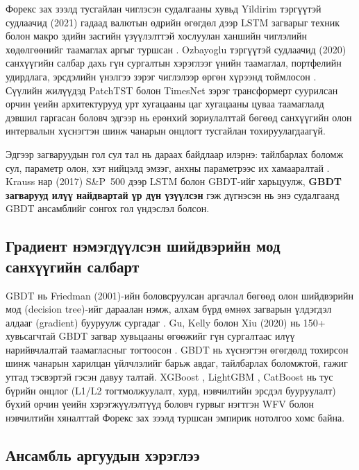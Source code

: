 Форекс зах зээлд тусгайлан чиглэсэн судалгааны хувьд Yildirim тэргүүтэй судлаачид (2021) гадаад валютын өдрийн өгөгдөл дээр LSTM загварыг техник болон макро эдийн засгийн үзүүлэлттэй хослуулан ханшийн чиглэлийн хөдөлгөөнийг таамаглах аргыг туршсан \cite{yildirim2021forecasting}. Ozbayoglu тэргүүтэй судлаачид (2020) санхүүгийн салбар дахь гүн сургалтын хэрэглээг үнийн таамаглал, портфелийн удирдлага, эрсдэлийн үнэлгээ зэрэг чиглэлээр өргөн хүрээнд тоймлосон \cite{ozbayoglu2020deep}. Сүүлийн жилүүдэд PatchTST \cite{nie2023patchtst} болон TimesNet \cite{wu2023timesnet} зэрэг трансформерт суурилсан орчин үеийн архитектурууд урт хугацааны цаг хугацааны цуваа таамаглалд дэвшил гаргасан боловч эдгээр нь ерөнхий зориулалттай бөгөөд санхүүгийн олон интервалын хүснэгтэн шинж чанарын онцлогт тусгайлан тохируулагдаагүй.

Эдгээр загваруудын гол сул тал нь дараах байдлаар илэрнэ: тайлбарлах боломж сул, параметр олон, хэт нийцэлд эмзэг, анхны параметрээс их хамааралтай \cite{krauss2017deep}. Krauss нар (2017) S\&P~500 дээр LSTM болон GBDT-ийг харьцуулж, \textbf{GBDT загварууд илүү найдвартай үр дүн үзүүлсэн} гэж дүгнэсэн нь энэ судалгаанд GBDT ансамблийг сонгох гол үндэслэл болсон.

\subsection{Градиент нэмэгдүүлсэн шийдвэрийн мод санхүүгийн салбарт}

GBDT нь Friedman (2001)-ийн боловсруулсан аргачлал бөгөөд олон шийдвэрийн мод (decision tree)-ийг дараалан нэмж, алхам бүрд өмнөх загварын үлдэгдэл алдааг (gradient) бууруулж сургадаг \cite{friedman2001greedy}. Gu, Kelly болон Xiu (2020) нь 150+ хувьсагчтай GBDT загвар хувьцааны өгөөжийг гүн сургалтаас илүү нарийвчлалтай таамагласныг тогтоосон \cite{gu2020empirical}. GBDT нь хүснэгтэн өгөгдөлд тохирсон шинж чанарын харилцан үйлчлэлийг барьж авдаг, тайлбарлах боломжтой, гажиг утгад тэсвэртэй гэсэн давуу талтай. XGBoost \cite{chen2016xgboost}, LightGBM \cite{ke2017lightgbm}, CatBoost \cite{prokhorenkova2018catboost} нь тус бүрийн онцлог (L1/L2 тогтмолжуулалт, хурд, нэвчилтийн эрсдэл бууруулалт) бүхий орчин үеийн хэрэгжүүлэлтүүд боловч гурвыг нэгтгэн WFV болон нэвчилтийн хяналттай Форекс зах зээлд туршсан эмпирик нотолгоо хомс байна.

\subsection{Ансамбль аргуудын хэрэглээ}

